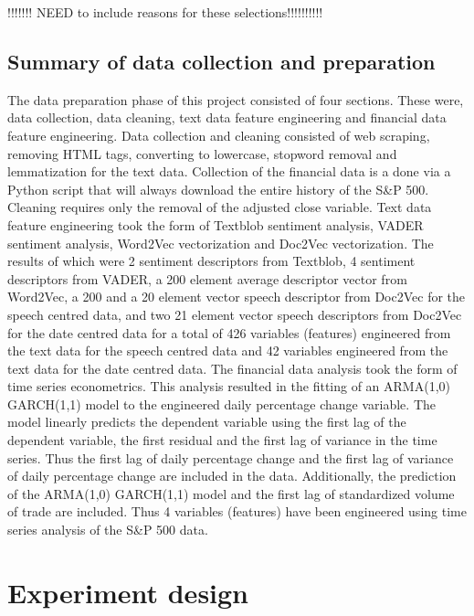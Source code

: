 \documentclass[11pt,preprint, authoryear]{elsarticle}
\numberwithin{equation}{section}
\numberwithin{figure}{section}
\numberwithin{table}{section}
\begin{document}
!!!!!!! NEED to include reasons for these selections!!!!!!!!!!

\hypertarget{summary-of-data-collection-and-preparation}{%
\subsection{Summary of data collection and
preparation}\label{summary-of-data-collection-and-preparation}}

The data preparation phase of this project consisted of four sections.
These were, data collection, data cleaning, text data feature
engineering and financial data feature engineering. Data collection and
cleaning consisted of web scraping, removing HTML tags, converting to
lowercase, stopword removal and lemmatization for the text data.
Collection of the financial data is a done via a Python script that will
always download the entire history of the S\&P 500. Cleaning requires
only the removal of the adjusted close variable. Text data feature
engineering took the form of Textblob sentiment analysis, VADER
sentiment analysis, Word2Vec vectorization and Doc2Vec vectorization.
The results of which were 2 sentiment descriptors from Textblob, 4
sentiment descriptors from VADER, a 200 element average descriptor
vector from Word2Vec, a 200 and a 20 element vector speech descriptor
from Doc2Vec for the speech centred data, and two 21 element vector
speech descriptors from Doc2Vec for the date centred data for a total of
426 variables (features) engineered from the text data for the speech
centred data and 42 variables engineered from the text data for the date
centred data. The financial data analysis took the form of time series
econometrics. This analysis resulted in the fitting of an ARMA(1,0)
GARCH(1,1) model to the engineered daily percentage change variable. The
model linearly predicts the dependent variable using the first lag of
the dependent variable, the first residual and the first lag of variance
in the time series. Thus the first lag of daily percentage change and
the first lag of variance of daily percentage change are included in the
data. Additionally, the prediction of the ARMA(1,0) GARCH(1,1) model and
the first lag of standardized volume of trade are included. Thus 4
variables (features) have been engineered using time series analysis of
the S\&P 500 data.

\hypertarget{experiment-design}{%
\section{Experiment design}\label{experiment-design}}
\end{document}

